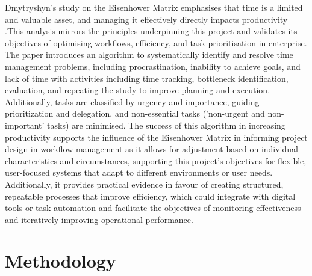 \documentclass{report}
\begin{document}
Dmytryshyn's study on the Eisenhower Matrix emphasises that time is a limited and valuable asset, and managing it effectively directly impacts productivity \parencite{dmytryshynProposalEffectiveTime2022}.This analysis mirrors the principles underpinning this project and validates its objectives of optimising workflows, efficiency, and task prioritisation in enterprise. 
The paper introduces an algorithm to systematically identify and resolve time management problems, including procrastination, inability to achieve goals, and lack of time with activities including time tracking, bottleneck identification, evaluation, and repeating the study to improve planning and execution.  
Additionally, tasks are classified by urgency and importance, guiding prioritization and delegation, and non-essential tasks ('non-urgent and non-important' tasks) are minimised. 
The success of this algorithm in increasing productivity supports the influence of the Eisenhower Matrix in informing project design in workflow management as it allows for adjustment based on individual characteristics and circumstances, supporting this project's objectives for flexible, user-focused systems that adapt to different environments or user needs. 
Additionally, it provides practical evidence in favour of creating structured, repeatable processes that improve efficiency, which could integrate with digital tools or task automation and facilitate the objectives of  monitoring effectiveness and iteratively improving operational performance.


\chapter{Methodology}  %
\end{document}
